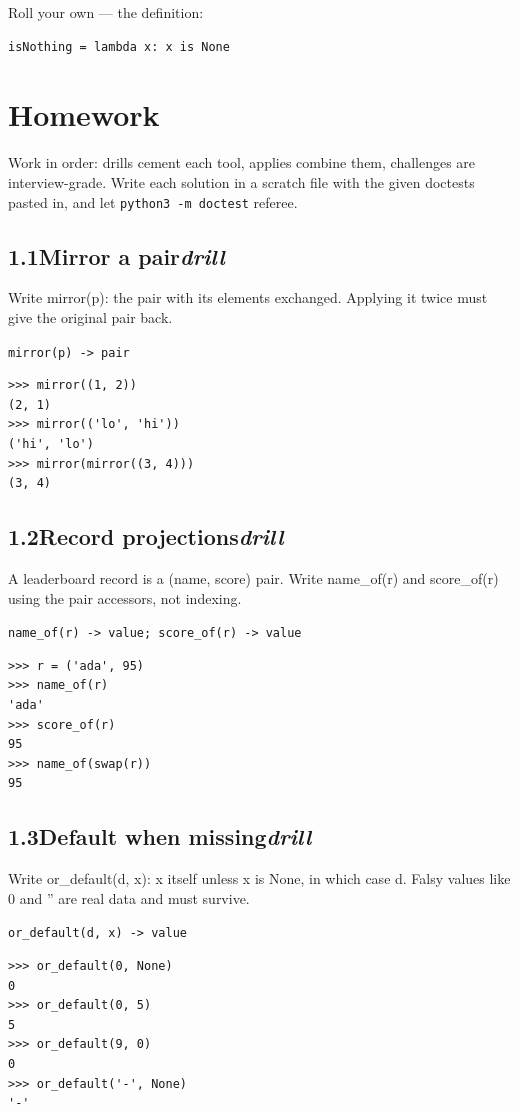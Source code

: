\documentclass[10pt,letterpaper]{book}
\begin{document}
Roll your own --- the definition:

\begin{lstlisting}[style=ex]
isNothing = lambda x: x is None
\end{lstlisting}

\section{Homework}
Work in order: drills cement each tool, applies combine them,
challenges are interview-grade. Write each solution in a scratch file with
the given doctests pasted in, and let \texttt{python3 -m doctest} referee.
\subsection*{1.1\quad Mirror a pair\hfill\textnormal{\textit{drill}}}
Write mirror(p): the pair with its elements exchanged. Applying it twice must give the original pair back.

\noindent\texttt{mirror(p) -> pair}
\begin{lstlisting}[style=ex]
>>> mirror((1, 2))
(2, 1)
>>> mirror(('lo', 'hi'))
('hi', 'lo')
>>> mirror(mirror((3, 4)))
(3, 4)
\end{lstlisting}
\subsection*{1.2\quad Record projections\hfill\textnormal{\textit{drill}}}
A leaderboard record is a (name, score) pair. Write name\_of(r) and score\_of(r) using the pair accessors, not indexing.

\noindent\texttt{name\_of(r) -> value; score\_of(r) -> value}
\begin{lstlisting}[style=ex]
>>> r = ('ada', 95)
>>> name_of(r)
'ada'
>>> score_of(r)
95
>>> name_of(swap(r))
95
\end{lstlisting}
\subsection*{1.3\quad Default when missing\hfill\textnormal{\textit{drill}}}
Write or\_default(d, x): x itself unless x is None, in which case d. Falsy values like 0 and '' are real data and must survive.

\noindent\texttt{or\_default(d, x) -> value}
\begin{lstlisting}[style=ex]
>>> or_default(0, None)
0
>>> or_default(0, 5)
5
>>> or_default(9, 0)
0
>>> or_default('-', None)
'-'
\end{lstlisting}
\end{document}
